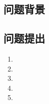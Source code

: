 \subsection{问题背景}



\subsection{问题提出}
\begin{enumerate}
	\item 
	\item 
	\item 
	\item 
	\item
\end{enumerate}